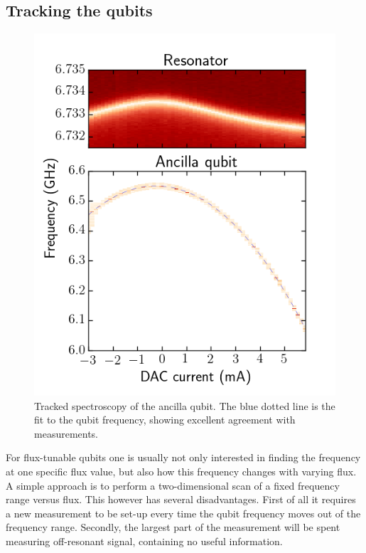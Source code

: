       \subsection{Tracking the qubits}
        \label{ssec:tracked spectroscopy}
        \begin{figure}[!htb]
          \centering
          \includegraphics[width=.7\textwidth]{Figures/Qubit characterization/Tracked_spectroscopy.png}
          \caption{Tracked spectroscopy of the ancilla qubit. The blue dotted line is the fit to the qubit frequency, showing excellent agreement with measurements.}
          \label{fig:tracked spectroscopy}
        \end{figure}


        For flux-tunable qubits one is usually not only interested in finding the frequency at one specific flux value, but also how this frequency changes with varying flux. A simple approach is to perform a two-dimensional scan of a fixed frequency range versus flux. This however has several disadvantages. First of all it requires a new measurement to be set-up every time the qubit frequency moves out of the frequency range. Secondly, the largest part of the measurement will be spent measuring off-resonant signal, containing no useful information.

